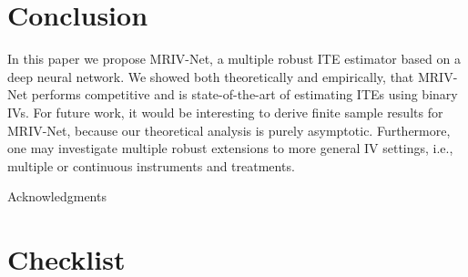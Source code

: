 \documentclass[nonatbib]{article}
\newcommand{\modelname}{\mbox{MRIV-Net}\xspace}
\theoremstyle{definition}
\theoremstyle{plain}
\begin{document}
\section{Conclusion}
In this paper we propose \modelname, a multiple robust ITE estimator based on a deep neural network. We showed both theoretically and empirically, that \modelname performs competitive and is state-of-the-art of estimating ITEs using binary IVs. For future work, it would be interesting to derive finite sample results for \modelname, because our theoretical analysis is purely asymptotic. Furthermore, one may investigate multiple robust extensions to more general IV settings, i.e., multiple or continuous instruments and treatments.


\begin{ack}
Acknowledgments
\end{ack}

\clearpage
\printbibliography %



\section*{Checklist}
\end{document}
